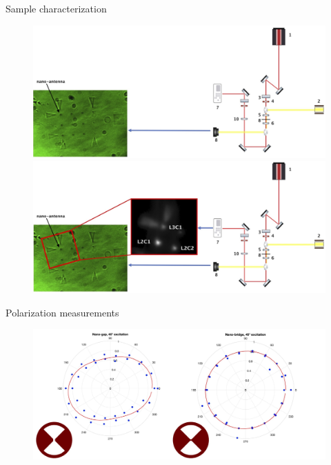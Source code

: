 \documentclass[xcolor = {dvipsnames}]{beamer}
\begin{document}
\begin{frame}{Sample characterization}
	\begin{figure}
    \begin{overprint}
     \centering\includegraphics[width=1.05\textwidth]{images/setup1}
    \centering\includegraphics[width=1.05\textwidth]{images/setup2}
    \end{overprint}
\end{figure}
\end{frame}

\begin{frame}[t]{Polarization measurements}
	\begin{figure}[h!]
	\centering
	\includegraphics[width=1.07\textwidth]{images/polarization}
	\end{figure}
\end{frame}
\end{document}
